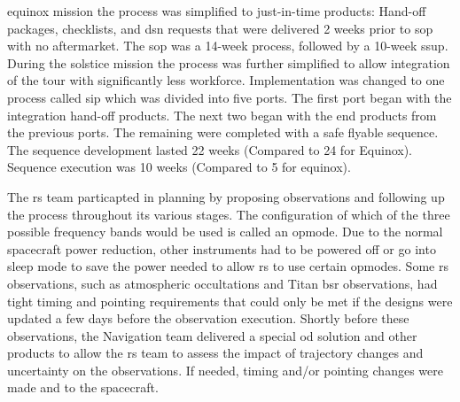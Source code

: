 \documentclass{article}
\begin{document}
                \gls{equinox mission} the process was simplified
                to just-in-time products: Hand-off packages,
                checklists, and \gls{dsn} requests that were
                delivered 2 weeks prior to \gls{sop} with no
                aftermarket. The \gls{sop} was a 14-week process,
                followed by a 10-week \gls{ssup}. During the
                \gls{solstice mission} the process was further
                simplified to allow integration of the tour
                with significantly less workforce. Implementation
                was changed to one process called \gls{sip} which
                was divided into five ports. The first port began
                with the integration hand-off products. The next
                two began with the end products from the previous
                ports. The remaining were completed with a safe
                flyable sequence. The sequence development lasted
                22 weeks (Compared to 24 for Equinox).
                Sequence execution was 10 weeks
                (Compared to 5 for equinox). 
                \par\hfill\par
                The \gls{rs} team particapted in planning by
                proposing observations and following up the
                process throughout its various stages. The
                configuration of which of the three possible
                frequency bands would be used is called an
                \gls{opmode}.
                Due to the normal spacecraft power reduction,
                other instruments had to be powered off or go
                into sleep mode to save the power needed to
                allow \gls{rs} to use certain \glspl{opmode}.
                Some \gls{rs} observations, such as atmospheric
                \glspl{occultation} and Titan \gls{bsr}
                observations, had tight timing and pointing
                requirements that could only be met if the
                designs were updated a few days before the
                observation execution. Shortly before these
                observations, the Navigation team delivered a
                special \gls{od} solution and other products to
                allow the \gls{rs} team to assess the impact of
                trajectory changes and uncertainty on the
                observations. If needed, timing and/or pointing
                changes were made and 
                to the spacecraft.
\end{document}
